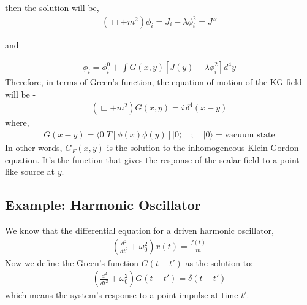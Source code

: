 \documentclass[14pt]{article} %
\begin{document}
{%
then the solution will be,
\begin{align*}
(\Box + m^2)\phi_i = J_i - \lambda \phi_i^2 =J''
\end{align*}
\begin{center} and \end{center}
\begin{align*}
\phi_i = \phi_i^0 + \int G(x,y) \left[ J(y) - \lambda \phi_i^2 \right] d^4y
\end{align*}
Therefore, in terms of Green's function, the equation of motion of the KG field will be -
\begin{align*}
(\Box + m^2) G(x,y) = i\,\delta^4(x - y)
\end{align*}
where,
\begin{align*}
G(x - y) = \langle 0 | T[\phi(x) \phi(y)] | 0 \rangle  \quad ; \quad |0\rangle = \text{vacuum state}
\end{align*}
In other words, $G_F(x,y)$ is the solution to the inhomogeneous Klein-Gordon equation. It's the function that gives the response of the scalar field to a point-like source at $y$.

\subsection*{Example: Harmonic Oscillator}

We know that the differential equation for a driven harmonic oscillator,
\begin{align*}
\left( \frac{d^2}{dt^2} + \omega_0^2 \right)x(t) = \frac{f(t)}{m}
\end{align*}
Now we define the Green’s function $G(t - t')$ as the solution to:
\begin{align*}
\left( \frac{d^2}{dt^2} + \omega_0^2 \right)G(t - t') = \delta(t - t')
\end{align*}
which means the system's response to a point impulse at time $t'$.\\

}
\end{document}
